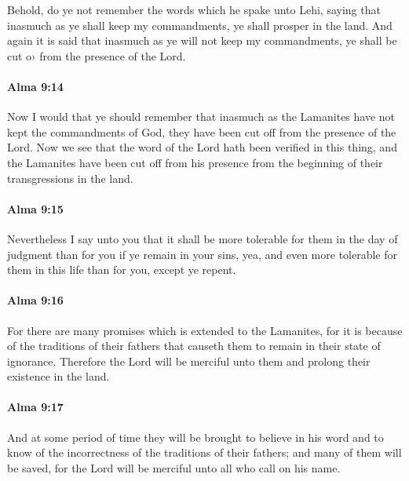 			Behold, do ye not remember the words which he spake unto Lehi,
			saying that inasmuch as ye shall keep my commandments,
			ye shall prosper in the land.
			And again it is said that inasmuch as ye will not keep my commandments,
			ye shall be cut o› from the presence of the Lord.

		\paragraph{Alma 9:14} %
			\label{ALMA-9-14}

			Now I would that ye should remember
			that inasmuch as the Lamanites have not kept the commandments of God,
			they have been cut off from the presence of the Lord.
			Now we see that the word of the Lord hath been verified in this thing,
			and the Lamanites have been cut off from his presence
			from the beginning of their transgressions in the land.

		\paragraph{Alma 9:15} %
			\label{ALMA-9-15}

			Nevertheless I say unto you
			that it shall be more tolerable for them in the day of judgment than for you
			if ye remain in your sins,
			yea, and even more tolerable for them in this life than for you,
			except ye repent.

		\paragraph{Alma 9:16} %
			\label{ALMA-9-16}

			For there are many promises which is extended to the Lamanites,
			for it is because of the traditions of their fathers
			that causeth them to remain in their state of ignorance.
			Therefore the Lord will be merciful unto them
			and prolong their existence in the land.

		\paragraph{Alma 9:17} %
			\label{ALMA-9-17}

			And at some period of time they will be brought to believe in his word
			and to know of the incorrectness of the traditions of their fathers;
			and many of them will be saved,
			for the Lord will be merciful unto all who call on his name.

